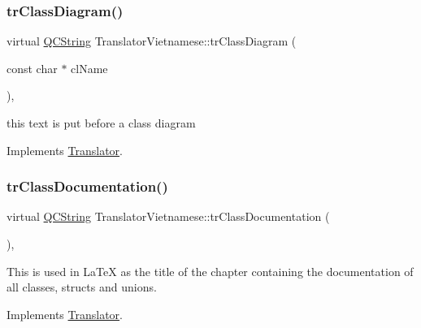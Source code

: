 \mbox{\label{class_translator_vietnamese_a3dec6e36f38f4f72d25f36ba0ca28c64}} 
\subsubsection{\texorpdfstring{trClassDiagram()}{trClassDiagram()}}
{\footnotesize\ttfamily virtual \mbox{\hyperlink{class_q_c_string}{Q\+C\+String}} Translator\+Vietnamese\+::tr\+Class\+Diagram (\begin{DoxyParamCaption}\item[{const char $\ast$}]{cl\+Name }\end{DoxyParamCaption})\hspace{0.3cm}{\ttfamily [inline]}, {\ttfamily [virtual]}}

this text is put before a class diagram 

Implements \mbox{\hyperlink{class_translator}{Translator}}.

\mbox{\label{class_translator_vietnamese_a7a6d4bda9ee0a4c36ff8ccd323f74ef7}} 
\subsubsection{\texorpdfstring{trClassDocumentation()}{trClassDocumentation()}}
{\footnotesize\ttfamily virtual \mbox{\hyperlink{class_q_c_string}{Q\+C\+String}} Translator\+Vietnamese\+::tr\+Class\+Documentation (\begin{DoxyParamCaption}{ }\end{DoxyParamCaption})\hspace{0.3cm}{\ttfamily [inline]}, {\ttfamily [virtual]}}

This is used in La\+TeX as the title of the chapter containing the documentation of all classes, structs and unions. 

Implements \mbox{\hyperlink{class_translator}{Translator}}.

\mbox{\label{class_translator_vietnamese_a2db25f6bd44d99bc9bf1b7aeb6367f05}} 
